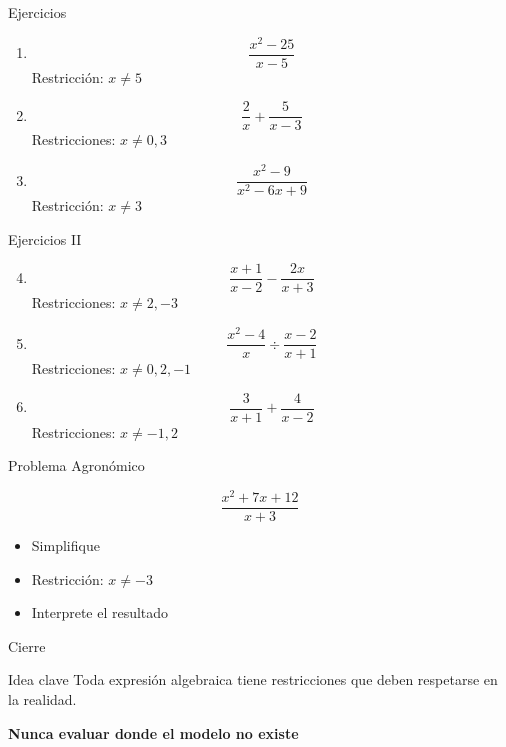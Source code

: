\documentclass[aspectratio=169,handout,11pt]{beamer}
\newenvironment{idea}{\begin{block}{Idea clave}}{\end{block}}
\begin{document}
	\begin{frame}{Ejercicios}
		\small
		
		\begin{enumerate}
			\item \[
			\frac{x^2-25}{x-5}
			\]
			Restricción: \(x \neq 5\)
			
			\item \[
			\frac{2}{x}+\frac{5}{x-3}
			\]
			Restricciones: \(x \neq 0, 3\)
			
			\item \[
			\frac{x^2-9}{x^2-6x+9}
			\]
			Restricción: \(x \neq 3\)
			
		\end{enumerate}
	\end{frame}
	
	\begin{frame}{Ejercicios II}
		\small
		
		\begin{enumerate}
			\setcounter{enumi}{3}
			
			\item \[
			\frac{x+1}{x-2}-\frac{2x}{x+3}
			\]
			Restricciones: \(x \neq 2, -3\)
			
			\item \[
			\frac{x^2-4}{x}\div\frac{x-2}{x+1}
			\]
			Restricciones: \(x \neq 0, 2, -1\)
			
			\item \[
			\frac{3}{x+1}+\frac{4}{x-2}
			\]
			Restricciones: \(x \neq -1, 2\)
			
		\end{enumerate}
	\end{frame}
	
	\begin{frame}{Problema Agronómico}
		\small
		
		\[
		\frac{x^2+7x+12}{x+3}
		\]
		
		\begin{itemize}
			\item Simplifique
			\item Restricción: \(x \neq -3\)
			\item Interprete el resultado
		\end{itemize}
		
	\end{frame}
	
	\begin{frame}{Cierre}
		\begin{idea}
			Toda expresión algebraica tiene restricciones que deben respetarse en la realidad.
		\end{idea}
		
		\pause
		
		\centering
		\textbf{Nunca evaluar donde el modelo no existe}
		
	\end{frame}
	
\end{document}
